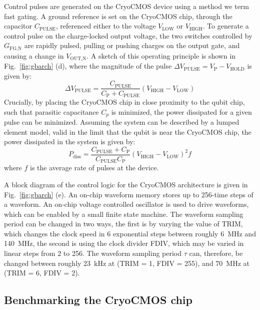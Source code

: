 Control pulses are generated on the CryoCMOS device using a method we term fast gating. A ground reference is set on the CryoCMOS chip, through the capacitor $C_\textrm{PULSE}$, referenced
either to the voltage $V_\textrm{LOW}$ or $V_\textrm{HIGH}$. To generate a control pulse on the charge-locked output voltage, the two switches controlled by $G_\textrm{FG,N}$ are rapidly pulsed,
pulling or pushing charges on the output gate, and causing a change in $V_\textrm{OUT,N}$. A sketch of this operating principle is shown in Fig.~\ref{fig:gbarch} (d), where the magnitude of the pulse $\Delta V_\textrm{PULSE} = V_\textrm{P} - V_\textrm{HOLD}$ is given by:
\begin{equation}
  \Delta V_\textrm{PULSE} = \frac{C_\textrm{PULSE}}{C_\textrm{P} + C_\textrm{PULSE}} (V_\textrm{HIGH} - V_\textrm{LOW})
\end{equation}
Crucially, by placing the CryoCMOS chip in close proximity to the qubit chip, such that parasitic capacitance $C_p$ is minimized, the power dissipated for a given pulse can be minimized.
Assuming the system can be described by a lumped element model, valid in the limit that the qubit is near the CryoCMOS chip, the power dissipated in the system is given by:
\begin{equation}
  P_\textrm{diss} = \frac{C_\textrm{PULSE} + C_\textrm{P}}{C_\textrm{PULSE}C_\textrm{P}} \left(V_\textrm{HIGH} - V_\textrm{LOW}\right)^2 f
  \label{eq:diss}
\end{equation}
where $f$ is the average rate of pulses at the device.

A block diagram of the control logic for the CryoCMOS architecture is given in Fig.~\ref{fig:gbarch} (e). An on-chip waveform memory stores up to 256-time steps of a waveform. An on-chip voltage controlled oscillator is used to drive waveforms, which can be enabled by a small finite state machine. The waveform sampling period can be changed in two ways,
the first is by varying the value of TRIM, which changes the clock speed in 6 exponential steps between roughly \SI{6}{\mega\hertz} and \SI{140}{\mega\hertz}, the second is using
the clock divider FDIV, which may be varied in linear steps from 2 to 256. The waveform sampling period $\tau$ can, therefore, be changed between roughly \SI{23}{\kilo\hertz} at
(TRIM = 1, FDIV = 255), and \SI{70}{\mega\hertz} at (TRIM = 6, FDIV = 2).

\subsection{Benchmarking the CryoCMOS chip}

